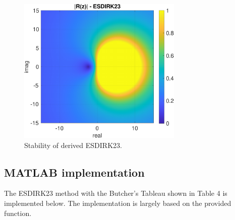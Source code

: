 \begin{figure}[h]
    \centering
    \includegraphics[width=0.7\textwidth]{plots/7_2a.pdf}
    \caption{Stability of derived ESDIRK23.}
    \label{fig:7_2}
\end{figure}

\subsection{MATLAB implementation}
The ESDIRK23 method with the Butcher's Tableau shown in Table 4 is implemented below. The implementation is largely based on the provided function.

